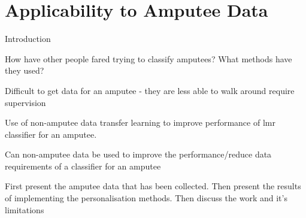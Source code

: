 \chapter{Applicability to Amputee Data}
\label{chp:amputee-data}
Introduction

How have other people fared trying to classify amputees? What methods have they used?

Difficult to get data for an amputee - they are less able to walk around require supervision

Use of non-amputee data transfer learning to improve performance of \acrshort{lmr} classifier for an amputee.

Can non-amputee data be used to improve the performance/reduce data requirements of a classifier for an amputee

First present the amputee data that has been collected. Then present the results of implementing the personalisation methods. Then discuss the work and it's limitations


